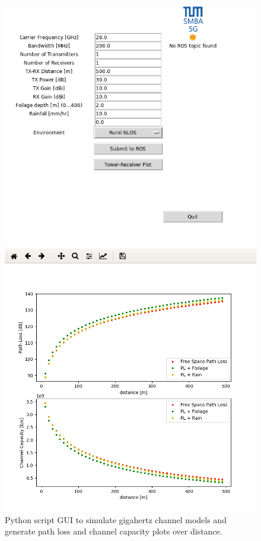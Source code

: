 \begin{figure}[htb]
    \centering
    \begin{minipage}{.4\textwidth}
        \centering
        \includegraphics[width=\linewidth]{smba_gui.png}
    \end{minipage}
    \hspace{.1\textwidth}
    \begin{minipage}{.4\textwidth}
        \centering
        \includegraphics[width=\linewidth]{smba_gui_2.png}
    \end{minipage}
        \caption{Python script GUI to simulate gigahertz channel models and generate path loss and channel
        capacity plots over distance.}
        \label{fig:gui}
\end{figure}


